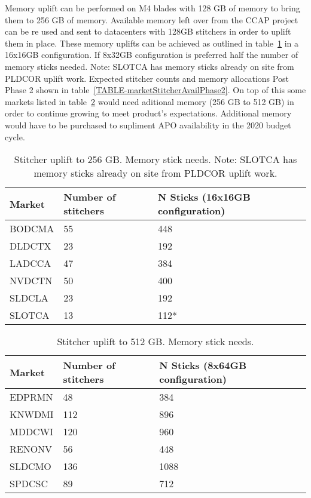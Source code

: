 \documentclass{article}
\begin{document}
Memory uplift can be performed on M4 blades with 128 GB of memory to bring them to 256 GB of memory. Available memory left over from the CCAP project can be re used and sent to datacenters with 128GB stitchers in order to uplift them in place. These memory uplifts can be achieved as outlined in table~\ref{TABLE-MemUpliftNeeds256} in a 16x16GB configuration. If 8x32GB configuration is preferred half the number of memory sticks needed. Note: SLOTCA has memory sticks already on site from PLDCOR uplift work. Expected stitcher counts and memory allocations Post Phase 2 shown in table~\ref{TABLE-marketStitcherAvailPhase2}. On top of this some markets listed in table~\ref{TABLE-MemUpliftNeeds512} would need aditional memory (256 GB to 512 GB) in order to continue growing to meet product's expectations. Additional memory would have to be purchased to supliment APO availability in the 2020 budget cycle. 

\begin{table}
\begin{tabular}{|l|l|l|} 
\hline Market & Number of stitchers & N Sticks (16x16GB configuration)\\
\hline BODCMA & 55 & 448\\
\hline DLDCTX & 23 & 192\\
\hline LADCCA & 47 & 384\\
\hline NVDCTN & 50 & 400\\
\hline SLDCLA & 23 & 192\\
\hline SLOTCA & 13 & 112*\\
\hline 
\end{tabular}
\caption{\label{TABLE-MemUpliftNeeds256}Stitcher uplift to 256 GB. Memory stick needs. Note: SLOTCA has memory sticks already on site from PLDCOR uplift work.} 
\end{table}

\begin{table}
\begin{tabular}{|l|l|l|} 
\hline Market & Number of stitchers & N Sticks (8x64GB configuration)\\
\hline EDPRMN & 48 & 384\\
\hline KNWDMI & 112 & 896\\
\hline MDDCWI & 120 & 960\\
\hline RENONV & 56 & 448\\
\hline SLDCMO & 136 & 1088\\
\hline SPDCSC & 89 & 712\\
\hline 
\end{tabular}
\caption{\label{TABLE-MemUpliftNeeds512}Stitcher uplift to 512 GB. Memory stick needs.} 
\end{table}
\end{document}
